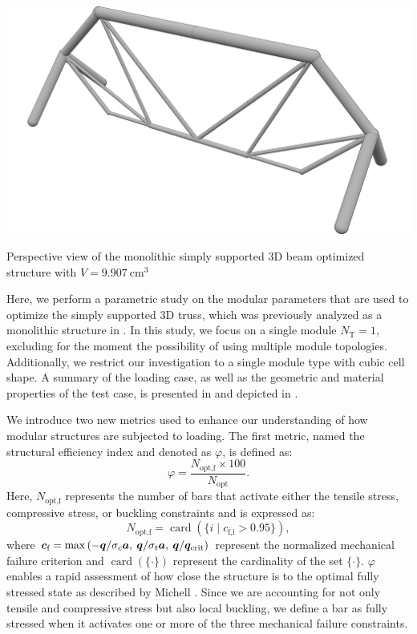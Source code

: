 \begin{marginfigure}
    \centering
    \includegraphics[width=\linewidth]{figures/04_TTO_improvements/16_supported_3D_sol/04_Topology_NLP_iso-min.png}
    \caption{Perspective view of the monolithic simply supported 3D beam optimized structure with $V=\qty{9.907}{\centi\meter^3}$}
    \label{fig:05}
\end{marginfigure}
Here, we perform a parametric study on the modular parameters that are used to optimize the simply supported 3D truss, which was previously analyzed as a monolithic structure in . In this study, we focus on a single module $N_\text{T} = 1$, excluding for the moment the possibility of using multiple module topologies. Additionally, we restrict our investigation to a single module type with cubic cell shape. A summary of the loading case, as well as the geometric and material properties of the test case, is presented in  and depicted in .

We introduce two new metrics used to enhance our understanding of how modular structures are subjected to loading. The first metric, named the structural efficiency index and denoted as $\varphi$, is defined as:
\begin{equation}
    \varphi = \frac{N_\text{opt,f}\times100}{N_\text{opt}}.
\end{equation}
Here, $N_\text{opt,f}$ represents the number of bars that activate either the tensile stress, compressive stress, or buckling constraints and is expressed as:
\begin{equation}
    N_\text{opt,f} = \operatorname{card}(\{i\;|\;c_\text{f,i} > 0.95\}),
\end{equation}
where $\bm{c}_\text{f}=\max{\left(-\bm{q} /\sigma_c \bm{a},\:\bm{q} /\sigma_t \bm{a},\:\bm{q}/\bm{q}_{\text{crit}}\right)}$ represent the normalized mechanical failure criterion and $\operatorname{card}(\{\cdot\})$ represent the cardinality of the set $\{\cdot\}$. $\varphi$ enables a rapid assessment of how close the structure is to the optimal fully stressed state as described by Michell . Since we are accounting for not only tensile and compressive stress but also local buckling, we define a bar as fully stressed when it activates one or more of the three mechanical failure constraints.

